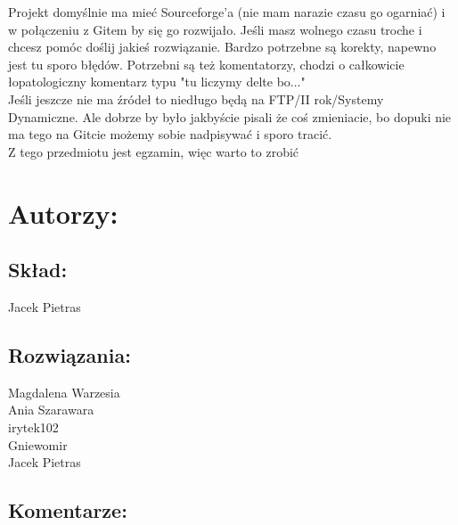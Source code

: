 \documentclass[a4paper,10pt]{article}
\begin{document}
Projekt domyślnie ma mieć Sourceforge'a (nie mam narazie czasu go ogarniać) i w połączeniu z Gitem by się go rozwijało.
Jeśli masz wolnego czasu troche i chcesz pomóc doślij jakieś rozwiązanie.
Bardzo potrzebne są korekty, napewno jest tu sporo błędów.
Potrzebni są też komentatorzy, chodzi o całkowicie łopatologiczny komentarz typu "tu liczymy delte bo..."\\
Jeśli jeszcze nie ma źródeł to niedługo będą na FTP/II rok/Systemy Dynamiczne. Ale dobrze by było jakbyście pisali że coś zmieniacie, bo dopuki nie ma tego na Gitcie możemy sobie nadpisywać i sporo tracić.\\
Z tego przedmiotu jest egzamin, więc warto to zrobić



\pagebreak
\section*{Autorzy:}

\subsection*{Skład:} 
Jacek Pietras

\subsection*{Rozwiązania:} 
Magdalena Warzesia\\
Ania Szarawara\\
irytek102\\
Gniewomir\\
Jacek Pietras

\subsection*{Komentarze:} 
\end{document}
